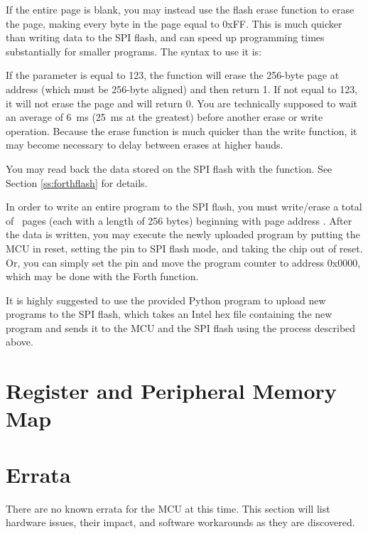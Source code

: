 \documentclass[11pt,pdftex,portrait,letterpaper]{article}
\begin{document}
If the entire page is blank, you may instead use the flash erase  function to erase the page, making every byte in the page equal to 0xFF. This is much quicker than writing data to the SPI flash, and can speed up programming times substantially for smaller programs. The syntax to use it is:

\noindent{}

If the  parameter is equal to 123, the function will erase the 256-byte page at address  (which must be 256-byte aligned) and then return 1. If not equal to 123, it will not erase the page and will return 0. You are technically supposed to wait an average of 6~ms (25~ms at the greatest) before another erase or write operation. Because the erase function is much quicker than the write function, it may become necessary to delay between erases at higher bauds.

You may read back the data stored on the SPI flash with the  function. See Section \ref{ss:forthflash} for details.

In order to write an entire program to the SPI flash, you must write/erase a total of \RamNumPages\ pages (each with a length of 256 bytes) beginning with page address \RamStartAddress. After the data is written, you may execute the newly uploaded program by putting the MCU in reset, setting the  pin to SPI flash mode, and taking the chip out of reset. Or, you can simply set the  pin and move the program counter to address 0x0000, which may be done with the  Forth function.

It is highly suggested to use the provided Python program  to upload new programs to the SPI flash, which takes an Intel hex file containing the new program and sends it to the MCU and the SPI flash using the process described above.

\newpage







\section{Register and Peripheral Memory Map} \label{s:regMemMap}


\newpage

\section{Errata} \label{s:errata}
There are no known errata for the {\AsicNameForUserGuide} MCU at this time. This section will list hardware issues, their impact, and software workarounds as they are discovered.
\end{document}
